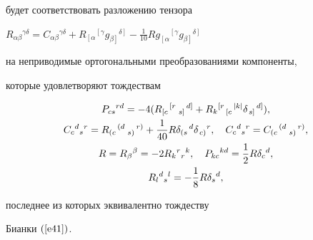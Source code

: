 \begin{thm}
\begin{equation}
\end{equation}


будет соответствовать разложению тензора


$R_{\alpha\beta}{}^{\gamma\delta}=C_{\alpha\beta}{}^{\gamma\delta}+


R_{\left[\alpha \right.}{}^{\left[ \gamma \right.}


g_{\left.\beta \right]}{}^{\left. \delta \right]}-


\frac{1}{10}Rg_{\left[\alpha \right.}{}^{\left[ \gamma \right.}


g_{\left.\beta \right]}{}^{\left. \delta \right]}$


на неприводимые ортогональными преобразованиями компоненты,


которые удовлетворяют тождествам


\begin{gather}




P_{cs}{}^{rd}=-4(R_{\left[c \right.}{}^{\left[r \right.}


{}_{\left. s \right]}{}^{\left. d\right]}+


R_k{}^{\left[r \right.}{}_{\left[c \right.}{}^{\left|k\right|}


\delta_{\left. s\right]}{}^{\left.d\right]}),\notag\\


%


\label{e47}


C_c{}^d{}_s{}^r=R_{\left(c \right.}{}^{\left(d \right.}{}_


{\left. s\right)}{}^{\left. r\right)}+


\frac{1}{40} R\delta_{\left(s \right.}{}^d


\delta_{\left. c\right)}{}^r,\quad


C_c{}^d{}_s{}^r=C_{\left(c \right.}{}^{\left(d \right.}{}_


{\left. s\right)}{}^{\left.r\right)}, \\


%




R=R_\beta{}^\beta=-2 R_k{}^r{}_r{}^k,\quad


P_{kc}{}^{kd}=\frac{1}{2} R\delta_c{}^d, \notag\\


%


\label{e49} %


R_l{}^d{}_s{}^l=-\frac{1}{8} R\delta_s{}^d,


\end{gather}


последнее из которых эквивалентно тождеству


Бианки $(\ref{e41})$.


\end{thm}





